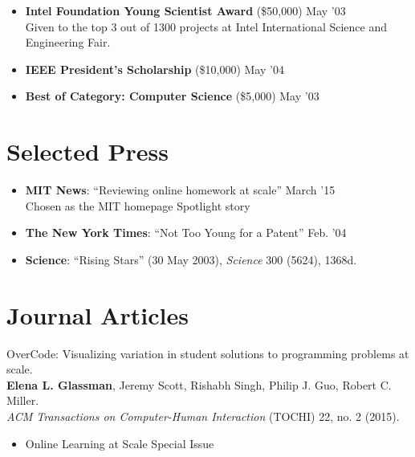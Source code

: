 \documentclass[margin]{res}
\begin{document}
\begin{resume}
\begin{itemize}[leftmargin=*]
\begin{itemize}[leftmargin=*]
\item {\bf Intel Foundation Young Scientist Award} (\$50,000) \hfill May '03 \\Given to the top 3 out of 1300 projects at Intel International Science and Engineering Fair.
\item {\bf IEEE President's Scholarship} (\$10,000) \hfill May '04
\item {\bf Best of Category: Computer Science} (\$5,000) \hfill May '03
\end{itemize}
\end{itemize}

\section{Selected Press}
\begin{itemize}[leftmargin=*] \itemsep -2pt
\item \textbf{MIT News}: ``Reviewing online homework at scale'' \hfill March '15 \\
Chosen as the MIT homepage Spotlight story 
\item \textbf{The New York Times}: ``Not Too Young for a Patent'' \hfill Feb. '04
\item \textbf{Science}: ``Rising Stars'' (30 May 2003), \textit{Science} 300 (5624), 1368d.

\end{itemize}
 
\section{Journal Articles}

OverCode: Visualizing variation in student solutions to programming problems at scale.\\
{\bf Elena L. Glassman}, Jeremy Scott, Rishabh Singh, Philip J. Guo, Robert C. Miller. \\ 
{\it ACM Transactions on Computer-Human Interaction} (TOCHI) 22, no. 2 (2015).
\begin{itemize} \itemsep -2pt 
\item Online Learning at Scale Special Issue
\end{itemize}


\end{resume}
\end{document}
